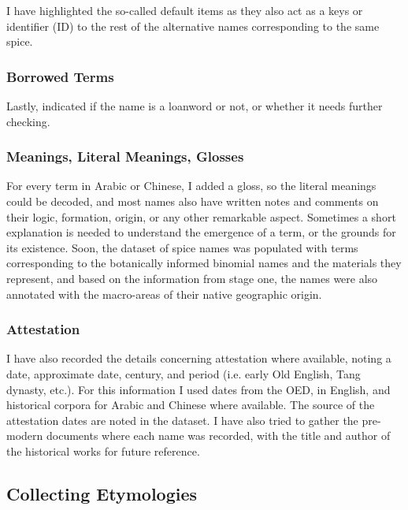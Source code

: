 I have highlighted the so-called default items as they also act as a keys or identifier (ID) to the rest of the alternative names corresponding to the same spice.

\subsubsection{Borrowed Terms}

Lastly, indicated if the name is a loanword or not, or whether it needs further checking. %

\subsubsection{Meanings, Literal Meanings, Glosses}

For every term in Arabic or Chinese, I added a gloss, so the literal meanings could be decoded, and most names also have written notes and comments on their logic, formation, origin, or any other remarkable aspect. Sometimes a short explanation is needed to understand the emergence of a term, or the grounds for its existence. Soon, the dataset of spice names was populated with terms corresponding to the botanically informed binomial names and the materials they represent, and based on the information from stage one, the names were also annotated with the macro-areas of their native geographic origin.


\subsubsection{Attestation}

I have also recorded the details concerning attestation where available, noting a date, approximate date, century, and period (i.e. early Old English, Tang dynasty, etc.). For this information I used dates from the \gls{OED}, in English, and historical corpora for Arabic and Chinese where available. The source of the attestation dates are noted in the dataset. I have also tried to gather the pre-modern documents where each name was recorded, with the title and author of the historical works for future reference. %


\subsection{Collecting Etymologies}

